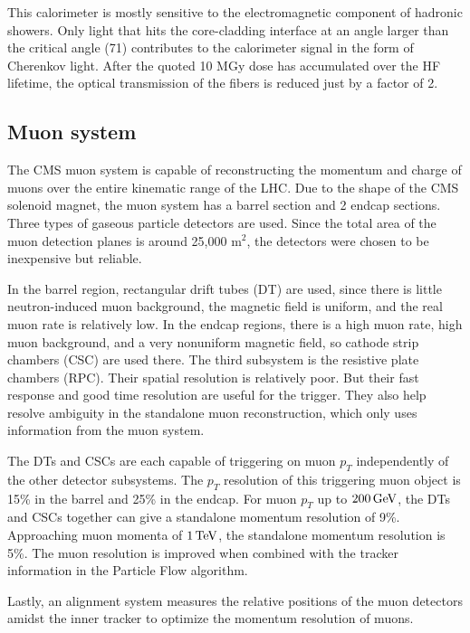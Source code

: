 This calorimeter is mostly sensitive to the electromagnetic component of hadronic showers.
Only light that hits the core-cladding interface at an angle larger than the critical angle (71\textdegree) contributes to the calorimeter signal in the form of Cherenkov light. 
After the quoted 10 MGy dose has accumulated over the HF lifetime, the optical transmission of the fibers is reduced just by a factor of 2.

\subsection{Muon system}
\label{ss:muonsystem}
The CMS muon system is capable of reconstructing the momentum and charge of muons over the entire
kinematic range of the LHC. 
Due to the shape of the CMS solenoid magnet, the muon system has a barrel section and 2 endcap sections.
Three types of gaseous particle detectors are used.
Since the total area of the muon detection planes is around 25,000 $\textrm{m}^2$, the 
detectors were chosen to be inexpensive but reliable.

In the barrel region, rectangular drift tubes (DT) are used, 
since there is little neutron-induced muon background, the magnetic field is uniform,
and the real muon rate is relatively low.
In the endcap regions, there is a high muon rate, high muon background, and a
very nonuniform magnetic field, so cathode strip chambers (CSC) are used there.
The third subsystem is the resistive plate chambers (RPC). Their spatial resolution is relatively poor.
But their fast response and good time resolution are useful for the trigger.
They also help resolve ambiguity in the standalone muon reconstruction,
which only uses information from the muon system.

The DTs and CSCs are each capable of triggering on muon $p_T$ independently of the other detector subsystems.
The $p_T$ resolution of this triggering muon object is 15\% in the barrel and 25\% in the endcap.
For muon $p_T$ up to $200 \,\text{Ge\hspace{-.08em}V}$, the DTs and CSCs together can give a standalone momentum resolution of 9\%.
Approaching muon momenta of $1 \,\text{Te\hspace{-.08em}V}$, the standalone momentum resolution is 5\%.
The muon resolution is improved when combined with the tracker information in the Particle Flow algorithm.

Lastly, an alignment system measures the relative positions of the muon detectors amidst the inner tracker to optimize the momentum resolution of muons.

